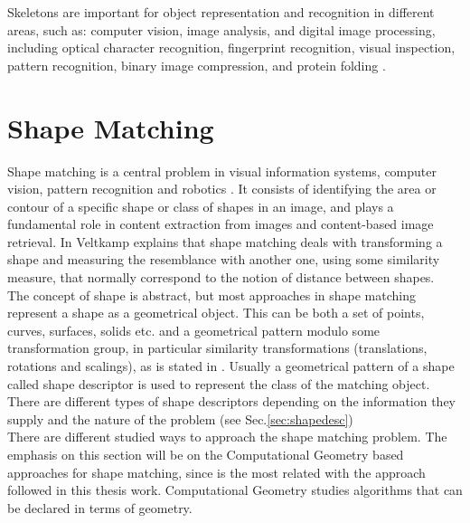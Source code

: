 Skeletons are important for object representation and recognition in different areas,
such as: computer vision, image analysis, and digital image processing, 
including optical character recognition, fingerprint recognition, visual inspection,
pattern recognition, binary image compression, and protein folding \cite{skprotein}.


\section{Shape Matching}
\label{sec:shapefitting}

Shape matching is a central problem in visual information systems,
computer vision, pattern recognition and robotics \cite{matchingbook}. 
It consists of identifying the area or contour of a specific
shape or class of shapes in an image, and plays a fundamental
role in content extraction from images and content-based image
retrieval. In \cite{matching2} Veltkamp explains that shape 
matching deals with transforming a shape and measuring the 
resemblance with another one, using some similarity measure, that 
normally correspond to the notion of distance between shapes.\\
The concept of shape is abstract, but most approaches in 
shape matching represent a shape as a geometrical object.
This can be both a set of points, curves, surfaces, solids etc.
and a geometrical pattern modulo some transformation group,
in particular similarity transformations (translations, rotations 
and scalings), as is stated in \cite{matching2}. Usually a
geometrical pattern of a shape called shape descriptor
is used to represent the class of the matching object. There are
different types of shape descriptors depending on the information
they supply and the nature of the problem (see Sec.\ref{sec:shapedesc}) \\

There are different studied ways to approach the shape matching 
problem. The emphasis on this section will be on the Computational
Geometry based approaches for shape matching, since is the most related with
the approach followed in this thesis work. Computational
Geometry studies algorithms that can be declared in terms of 
geometry.\\

